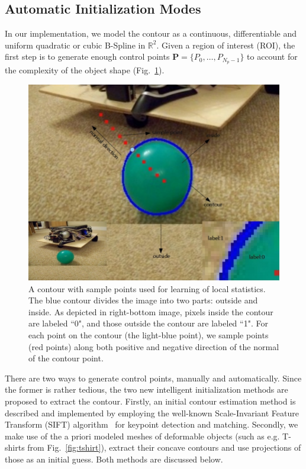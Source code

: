 \documentclass[conference]{IEEEtran}
\begin{document}
\subsection{Automatic Initialization Modes}
In our implementation, we model the
contour as a continuous, differentiable and uniform quadratic or cubic
B-Spline in $\mathbb{R}^2$.
Given a region of interest (ROI), the first step is to generate
enough control points $\mathbf{P} = \{P_0, \ldots, P_{N_p-1}\}$ to
account for the complexity of the object shape (Fig.~\ref{fig:prior}).

\begin{figure}[htb]
  \centering
  \includegraphics[width=\columnwidth]{images/cont.jpg}
\caption{A contour with sample points used for learning of local statistics. The blue contour
  divides the image into two parts: outside and inside. As depicted in
  right-bottom image, pixels inside the contour are labeled ``0",
  and those outside the contour are labeled ``1". For each point on the
  contour (the light-blue point), we sample points (red points) along both positive
  and negative direction of the normal of the contour point.}
\label{fig:prior}
\end{figure}

There are two ways to generate control points, manually and automatically. 
Since the former is rather tedious, the two new
intelligent initialization methods are proposed to extract the
contour. Firstly, an initial contour estimation method is described and
implemented by employing the well-known Scale-Invariant Feature Transform 
(SIFT) algorithm~\cite{lowe2004distinctive} for
keypoint detection and matching. Secondly, we make use of the a priori
modeled meshes of deformable objects (such as e.g. T-shirts from Fig.~\ref{fig:tshirt}), 
extract their concave contours and use projections of those as an initial guess. Both 
methods are discussed below.
\end{document}
